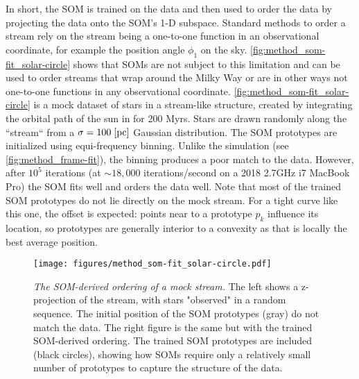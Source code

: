 \documentclass[fleqn,usenatbib]{mnras}
\begin{document}
      In short, the SOM is trained on the data and then used to order the data
      by projecting the data onto the SOM's 1-D subspace. Standard methods to
      order a stream rely on the stream being a one-to-one function in an
      observational coordinate, for example the position angle $\phi_1$ on the
      sky. \autoref{fig:method_som-fit_solar-circle} shows that SOMs are not
      subject to this limitation and can be used to order streams that wrap
      around the Milky Way or are in other ways not one-to-one functions in any
      observational coordinate. \autoref{fig:method_som-fit_solar-circle} is a
      mock dataset of stars in a stream-like structure, created by integrating
      the orbital path of the sun \citep{Reid2004, GRAVITY2018, Drimmel2018,
      Bennett2019} in \galpyMWPotential{} for 200 Myrs. Stars are drawn randomly
      along the ``stream`` from a $\sigma=100 \; [\rm{pc}]$ Gaussian
      distribution. The SOM prototypes are initialized using equi-frequency
      binning. Unlike the  simulation (see
      \autoref{fig:method_frame-fit}), the binning produces a poor match to the
      data. However, after $10^5$ iterations (at $\sim\!18,000$
      iterations/second on a 2018 2.7GHz i7 MacBook Pro) the SOM fits well and
      orders the data well. Note that most of the trained SOM prototypes do not
      lie directly on the mock stream. For a tight curve like this one, the
      offset is expected: points near to a prototype $p_k$ influence its
      location, so prototypes are generally interior to a convexity as that is
      locally the best average position.

      \begin{figure}
        \centering
        \texttt{[image: figures/method\_som-fit\_solar-circle.pdf]}
        \caption{
          \emph{The SOM-derived ordering of a mock stream.}
          The left shows a z-projection of the stream, with stars "observed" in
          a random sequence. The initial position of the SOM prototypes (gray)
          do not match the data. The right figure is the same but with the
          trained SOM-derived ordering. The trained SOM prototypes are included
          (black circles), showing how SOMs require only a relatively small
          number of prototypes to capture the structure of the data. }
        \label{fig:method_som-fit_solar-circle}
      \end{figure}
\end{document}
